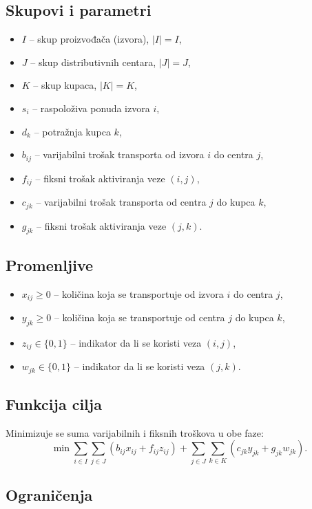 \documentclass[12pt,a4paper]{article}
\begin{document}
\subsection{Skupovi i parametri}
\begin{itemize}
    \item $I$ -- skup proizvođača (izvora), $|I| = I$,
    \item $J$ -- skup distributivnih centara, $|J| = J$,
    \item $K$ -- skup kupaca, $|K| = K$,
    \item $s_i$ -- raspoloživa ponuda izvora $i$,
    \item $d_k$ -- potražnja kupca $k$,
    \item $b_{ij}$ -- varijabilni trošak transporta od izvora $i$ do centra $j$,
    \item $f_{ij}$ -- fiksni trošak aktiviranja veze $(i,j)$,
    \item $c_{jk}$ -- varijabilni trošak transporta od centra $j$ do kupca $k$,
    \item $g_{jk}$ -- fiksni trošak aktiviranja veze $(j,k)$.
\end{itemize}

\subsection{Promenljive}
\begin{itemize}
    \item $x_{ij} \ge 0$ -- količina koja se transportuje od izvora $i$ do centra $j$,
    \item $y_{jk} \ge 0$ -- količina koja se transportuje od centra $j$ do kupca $k$,
    \item $z_{ij} \in \{0,1\}$ -- indikator da li se koristi veza $(i,j)$,
    \item $w_{jk} \in \{0,1\}$ -- indikator da li se koristi veza $(j,k)$.
\end{itemize}

\subsection{Funkcija cilja}
Minimizuje se suma varijabilnih i fiksnih troškova u obe faze:
\[
\min \sum_{i \in I}\sum_{j \in J} \left( b_{ij}x_{ij} + f_{ij}z_{ij} \right)
+ \sum_{j \in J}\sum_{k \in K} \left( c_{jk}y_{jk} + g_{jk}w_{jk} \right).
\]

\subsection{Ograničenja}
\end{document}
